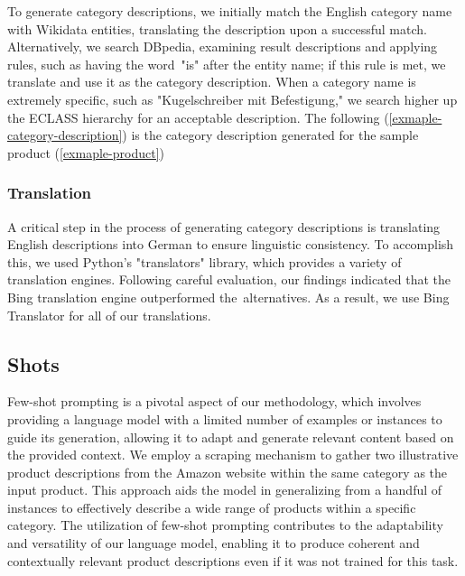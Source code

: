 To generate category descriptions, we initially match the English category name with Wikidata entities, translating the description upon a successful match. Alternatively, we search DBpedia, examining result descriptions and applying rules, such as having the word "is" after the entity name; if this rule is met, we translate and use it as the category description. When a category name is extremely specific, such as "Kugelschreiber mit Befestigung," we search higher up the ECLASS hierarchy for an acceptable description. The following (\autoref{exmaple-category-description}) is the category description generated for the sample product (\autoref{exmaple-product})

\begin{center}
	\par
\end{center}

\subsubsection{Translation}

A critical step in the process of generating category descriptions is translating English descriptions into German to ensure linguistic consistency. To accomplish this, we used Python's "translators" library, which provides a variety of translation engines. Following careful evaluation, our findings indicated that the Bing translation engine outperformed the alternatives. As a result, we use Bing Translator for all of our translations.

\subsection{Shots}

Few-shot prompting is a pivotal aspect of our methodology, which involves providing a language model with a limited number of examples or instances to guide its generation, allowing it to adapt and generate relevant content based on the provided context. We employ a scraping mechanism to gather two illustrative product descriptions from the Amazon website within the same category as the input product. This approach aids the model in generalizing from a handful of instances to effectively describe a wide range of products within a specific category. The utilization of few-shot prompting contributes to the adaptability and versatility of our language model, enabling it to produce coherent and contextually relevant product descriptions even if it was not trained for this task.

